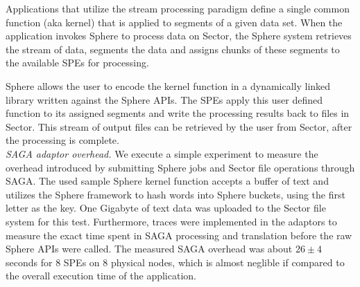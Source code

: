\documentclass[3p,twocolumn]{elsarticle}
\begin{document}
Applications that utilize the stream processing paradigm define a
single common function (aka kernel) that is applied to segments of a
given data set.  When the application invokes Sphere to process data
on Sector, the Sphere system retrieves the stream of data, segments
the data and assigns chunks of these segments to the available SPEs
for processing.

Sphere allows the user to encode the kernel function in a dynamically
linked library written against the Sphere APIs.  The SPEs apply this
user defined function to its assigned segments and write the
processing results back to files in Sector.  This stream of output
files can be retrieved by the user from Sector, after the processing
is complete.\\


\textit{SAGA adaptor overhead.}
%
We execute a simple experiment to measure the overhead introduced by
submitting Sphere jobs and Sector file operations through SAGA.  The
used sample Sphere kernel function accepts a buffer of text and
utilizes the Sphere framework to hash words into Sphere buckets, using
the first letter as the key. One Gigabyte of text data was uploaded to
the Sector file system for this test.  Furthermore, traces were
implemented in the adaptors to measure the exact time spent in SAGA
processing and translation before the raw Sphere APIs were called.
The measured SAGA overhead was about $26 \pm 4$ seconds for 8 SPEs on
8 physical nodes, which is almost neglible if compared to the overall
execution time of the application.



\end{document}
